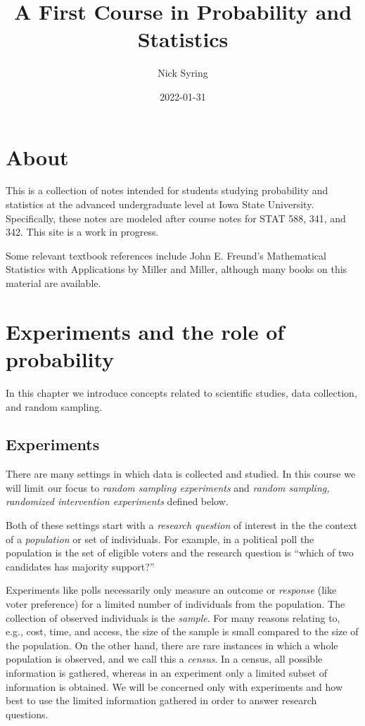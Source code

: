 \documentclass[]{book}
\title{A First Course in Probability and Statistics}
\author{Nick Syring}
\date{2022-01-31}
\begin{document}
\maketitle

{
\setcounter{tocdepth}{1}
\tableofcontents
}
\chapter{About}\label{about}

This is a collection of notes intended for students studying probability
and statistics at the advanced undergraduate level at Iowa State
University. Specifically, these notes are modeled after course notes for
STAT 588, 341, and 342. This site is a work in progress.

Some relevant textbook references include John E. Freund's Mathematical
Statistics with Applications by Miller and Miller, although many books
on this material are available.

\chapter{Experiments and the role of
probability}\label{experiments-and-the-role-of-probability}

In this chapter we introduce concepts related to scientific studies,
data collection, and random sampling.

\section{Experiments}\label{experiments}

There are many settings in which data is collected and studied. In this
course we will limit our focus to \emph{random sampling experiments} and
\emph{random sampling, randomized intervention experiments} defined
below.

Both of these settings start with a \emph{research question} of interest
in the the context of a \emph{population} or set of individuals. For
example, in a political poll the population is the set of eligible
voters and the research question is ``which of two candidates has
majority support?''

Experiments like polls necessarily only measure an outcome or
\emph{response} (like voter preference) for a limited number of
individuals from the population. The collection of observed individuals
is the \emph{sample}. For many reasons relating to, e.g., cost, time,
and access, the size of the sample is small compared to the size of the
population. On the other hand, there are rare instances in which a whole
population is observed, and we call this a \emph{census}. In a census,
all possible information is gathered, whereas in an experiment only a
limited subset of information is obtained. We will be concerned only
with experiments and how best to use the limited information gathered in
order to answer research questions.
\end{document}

